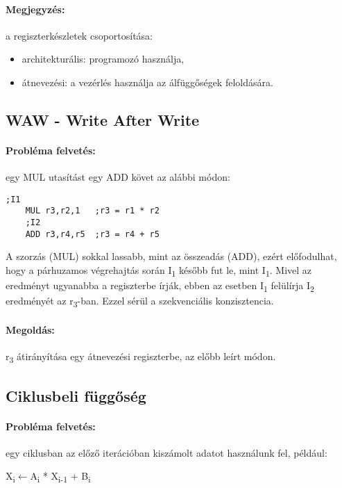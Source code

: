 \paragraph{Megjegyzés:} a regiszterkészletek csoportosítása:
\begin{itemize}
    \item architekturális: programozó használja,
    \item átnevezési: a vezérlés használja az álfüggőségek feloldására.
\end{itemize}

\subsection{WAW - Write After Write} \label{waw}
\paragraph{Probléma felvetés:} egy MUL utasítást egy ADD követ az alábbi módon:
\begin{lstlisting}[language=Ant]
    ;I1
    MUL r3,r2,1   ;r3 = r1 * r2
    ;I2
    ADD r3,r4,r5  ;r3 = r4 + r5
\end{lstlisting}
A szorzás (MUL) sokkal lassabb, mint az összeadás (ADD), ezért előfodulhat, hogy a párhuzamos
végrehajtás során I\textsubscript{1} később fut le, mint I\textsubscript{1}.
Mivel az eredményt ugyanabba a regiszterbe írják, ebben az esetben I\textsubscript{1} felülírja I\textsubscript{2} eredményét az r\textsubscript{3}-ban.
Ezzel sérül a szekvenciális konzisztencia.
\paragraph{Megoldás:} r\textsubscript{3} átirányítása egy átnevezési regiszterbe, az előbb leírt módon.

\subsection{Ciklusbeli függőség}

\paragraph{Probléma felvetés:}
egy ciklusban az előző iterációban kiszámolt adatot használunk fel, például:
\begin{algorithmic}
    \STATE X\textsubscript{i}$\leftarrow$A\textsubscript{i} * X\textsubscript{i-1} + B\textsubscript{i}
    \ENDFOR
\end{algorithmic}
